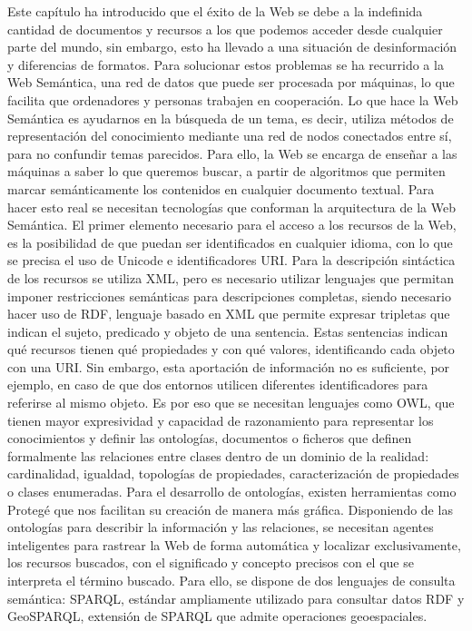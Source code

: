 Este capítulo ha introducido que el éxito de la Web se debe a la indefinida cantidad de documentos y recursos a los que podemos acceder desde cualquier parte del mundo, sin embargo, esto ha llevado a una situación de desinformación y diferencias de formatos. Para solucionar estos problemas se ha recurrido a la Web Semántica, una red de datos que puede ser procesada por máquinas, lo que facilita que ordenadores y personas trabajen en cooperación. Lo que hace la Web Semántica es ayudarnos en la búsqueda de un tema, es decir, utiliza métodos de representación del conocimiento mediante una red de nodos conectados entre sí, para no confundir temas parecidos. Para ello, la Web se encarga de enseñar a las máquinas a saber lo que queremos buscar, a partir de algoritmos que permiten marcar semánticamente los contenidos en cualquier documento textual. Para hacer esto real se necesitan tecnologías que conforman la arquitectura de la Web Semántica. El primer elemento necesario para el acceso a los recursos de la Web, es la posibilidad de que puedan ser identificados en cualquier idioma, con lo que se precisa el uso de Unicode e identificadores URI. Para la descripción sintáctica de los recursos se utiliza XML, pero es necesario utilizar lenguajes que permitan imponer restricciones semánticas para descripciones completas, siendo necesario hacer uso de RDF, lenguaje basado en XML que permite expresar tripletas que indican el sujeto, predicado y objeto de una sentencia. Estas sentencias indican qué recursos tienen qué propiedades y con qué valores, identificando cada objeto con una URI. Sin embargo, esta aportación de información no es suficiente, por ejemplo, en caso de que dos entornos utilicen diferentes identificadores para referirse al mismo objeto. Es por eso que se necesitan lenguajes como OWL, que tienen mayor expresividad y capacidad de razonamiento para representar los conocimientos y definir las ontologías, documentos o ficheros que definen formalmente las relaciones entre clases dentro de un dominio de la realidad: cardinalidad, igualdad, topologías de propiedades, caracterización de propiedades o clases enumeradas. Para el desarrollo de ontologías, existen herramientas como Protegé que nos facilitan su creación de manera más gráfica. Disponiendo de las ontologías para describir la información y las relaciones, se necesitan agentes inteligentes para rastrear la Web de forma automática y localizar exclusivamente, los recursos buscados, con el significado y concepto precisos con el que se interpreta el término buscado. Para ello, se dispone de dos lenguajes de consulta semántica: SPARQL, estándar ampliamente utilizado para consultar datos RDF y GeoSPARQL, extensión de SPARQL que admite operaciones geoespaciales.

